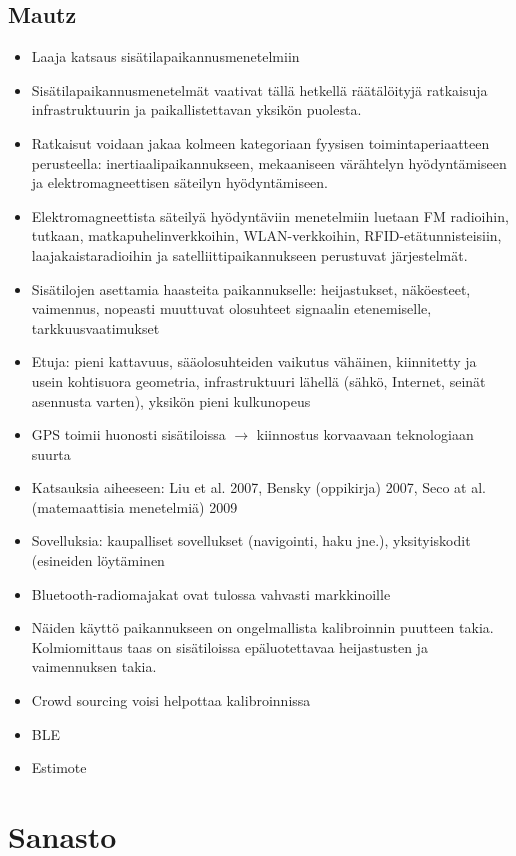 \documentclass[a4paper]{scrartcl}
\begin{document}
\subsection{Mautz\cite{mautz2012indoor}}
\begin{itemize}
	\item Laaja katsaus sisätilapaikannusmenetelmiin
	\item Sisätilapaikannusmenetelmät vaativat tällä hetkellä räätälöityjä
		ratkaisuja infrastruktuurin ja paikallistettavan yksikön puolesta.
	\item Ratkaisut voidaan jakaa kolmeen kategoriaan fyysisen
		toimintaperiaatteen perusteella: inertiaalipaikannukseen, mekaaniseen
		värähtelyn hyödyntämiseen ja elektromagneettisen säteilyn hyödyntämiseen.
	\item Elektromagneettista säteilyä hyödyntäviin menetelmiin luetaan
		FM radioihin, tutkaan, matkapuhelinverkkoihin, WLAN-verkkoihin,
		RFID-etätunnisteisiin, laajakaistaradioihin ja satelliittipaikannukseen
		perustuvat järjestelmät.
	\item Sisätilojen asettamia haasteita paikannukselle: heijastukset,
		näköesteet, vaimennus, nopeasti muuttuvat olosuhteet signaalin etenemiselle,
		tarkkuusvaatimukset
	\item Etuja: pieni kattavuus, sääolosuhteiden vaikutus vähäinen, kiinnitetty
		ja usein kohtisuora geometria, infrastruktuuri lähellä (sähkö, Internet,
		seinät asennusta varten), yksikön pieni kulkunopeus
	\item GPS toimii huonosti sisätiloissa $\rightarrow$ kiinnostus
		korvaavaan teknologiaan suurta
	\item Katsauksia aiheeseen: Liu et al. 2007, Bensky (oppikirja) 2007,
		Seco at al. (matemaattisia menetelmiä) 2009
	\item Sovelluksia: kaupalliset sovellukset (navigointi, haku jne.),
		yksityiskodit (esineiden löytäminen
\end{itemize}

\cite{faragher2012opportunistic}
\cite{sand2014positioning}
\cite{zhu2012improving}

\begin{itemize}
	\item Bluetooth-radiomajakat ovat tulossa vahvasti markkinoille
	\item Näiden käyttö paikannukseen on ongelmallista kalibroinnin puutteen
		takia. Kolmiomittaus taas on sisätiloissa epäluotettavaa heijastusten
		ja vaimennuksen takia.
	\item Crowd sourcing voisi helpottaa kalibroinnissa
	\item BLE
	\item Estimote
\end{itemize}

\section{Sanasto}

\glsaddall
\printglossary
\glsaddall
\printglossary[type=\acronymtype,title=Lyhenteet]



\end{document}
